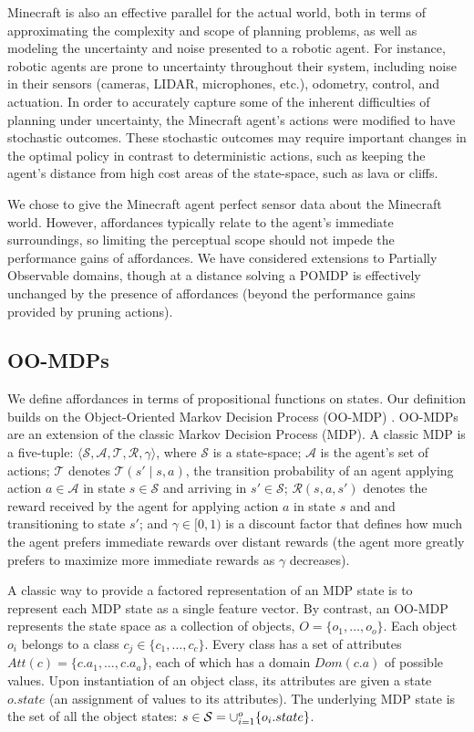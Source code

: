 \documentclass[letterpaper]{article}
\begin{document}
Minecraft is also an effective parallel for the actual world, both
in terms of approximating the complexity and scope of planning
problems, as well as modeling the uncertainty and noise presented to a
robotic agent.  For instance, robotic agents are prone to
uncertainty throughout their system, including noise in their
sensors (cameras, LIDAR, microphones, etc.), odometry, control, and
actuation.  In order to accurately capture some of the inherent
difficulties of planning under uncertainty, the Minecraft agent's
actions were modified to have stochastic outcomes. These stochastic
outcomes may require important changes in the optimal policy in
contrast to deterministic actions, such as keeping the agent's
distance from high cost areas of the state-space, such as lava or cliffs.

We chose to give the Minecraft agent perfect sensor data about the Minecraft world.
However, affordances typically relate to the agent's immediate surroundings,
so limiting the perceptual scope should not impede the performance gains of affordances.
We have considered extensions to Partially Observable domains, though at a distance
solving a POMDP is effectively unchanged by the presence of affordances (beyond the
performance gains provided by pruning actions).

\subsection{OO-MDPs}
We define affordances in terms of propositional functions on states. Our definition builds on the Object-Oriented Markov Decision Process
(OO-MDP) \cite{diuk08}.  OO-MDPs are an extension of
the classic Markov Decision Process (MDP).  A classic MDP is a
five-tuple: $\langle \mathcal{S}, \mathcal{A}, \mathcal{T},
\mathcal{R}, \gamma \rangle$, where $\mathcal{S}$ is a state-space;
$\mathcal{A}$ is the agent's set of actions; $\mathcal{T}$ denotes
$\mathcal{T}(s' \mid s,a)$, the transition probability of an agent
applying action $a \in \mathcal{A}$ in state $s \in \mathcal{S}$ and
arriving in $s' \in \mathcal{S}$; $\mathcal{R}(s,a,s')$ denotes the
reward received by the agent for applying action $a$ in state $s$ and
and transitioning to state $s'$; and $\gamma \in [0, 1)$ is a discount
  factor that defines how much the agent prefers immediate rewards
  over distant rewards (the agent more greatly prefers to maximize
  more immediate rewards as $\gamma$ decreases).

A classic way to provide a factored representation of an MDP state is to represent
each MDP state as a single feature vector. By contrast, an OO-MDP represents the state space as a collection of objects,
$O = \{o_1, \ldots, o_o \}$.  Each object $o_i$ belongs to a
class $c_j \in  \{c_1, \ldots, c_c\}$. Every class has a set of attributes
$Att(c) = \{c.a_1, \ldots, c.a_a \}$, each of which has a domain $Dom(c.a)$ of possible values.
Upon instantiation of an object class, its attributes are given a state $o.state$
(an assignment of values to its attributes).  The underlying MDP state is the set
of all the object states: $s \in {\cal S} = \cup_{i = 1}^o \{o_i.state\}$. 
\end{document}
